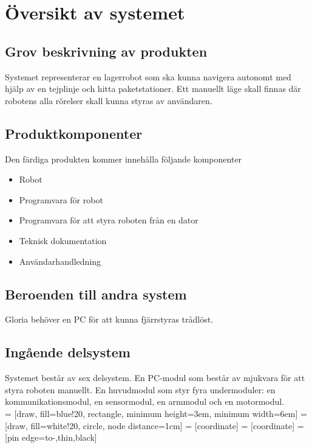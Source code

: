 \section{Översikt av systemet}

\subsection{Grov beskrivning av produkten}
Systemet representerar en lagerrobot som ska kunna navigera autonomt med hjälp av en tejplinje och hitta paketstationer. Ett manuellt läge skall finnas där robotens alla rörelser skall kunna styras av användaren.

\subsection{Produktkomponenter}
Den färdiga produkten kommer innehålla följande komponenter
\begin{itemize}
\item{Robot}
\item{Programvara för robot}
\item{Programvara för att styra roboten från en dator}
\item{Teknisk dokumentation}
\item{Användarhandledning}
\end{itemize}

\subsection{Beroenden till andra system}
Gloria behöver en PC för att kunna fjärrstyras trådlöst.

\subsection{Ingående delsystem}
Systemet består av sex delsystem. En PC-modul som består av mjukvara för att styra roboten manuellt. En huvudmodul som styr fyra undermoduler: en kommunikationsmodul, en sensormodul, en armmodul och en motormodul. \\

 = [draw, fill=blue!20, rectangle, 
    minimum height=3em, minimum width=6em]
 = [draw, fill=white!20, circle, node distance=1cm]
 = [coordinate]
 = [coordinate]
 = [pin edge={to-,thin,black}]


